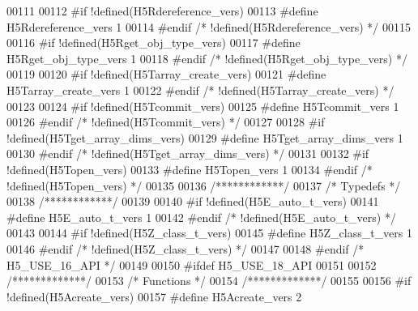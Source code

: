 \begin{DoxyCode}
00111 
00112 \textcolor{preprocessor}{#if !defined(H5Rdereference\_vers)}
00113 \textcolor{preprocessor}{  #define H5Rdereference\_vers 1}
00114 \textcolor{preprocessor}{#endif }\textcolor{comment}{/* !defined(H5Rdereference\_vers) */}\textcolor{preprocessor}{}
00115 
00116 \textcolor{preprocessor}{#if !defined(H5Rget\_obj\_type\_vers)}
00117 \textcolor{preprocessor}{  #define H5Rget\_obj\_type\_vers 1}
00118 \textcolor{preprocessor}{#endif }\textcolor{comment}{/* !defined(H5Rget\_obj\_type\_vers) */}\textcolor{preprocessor}{}
00119 
00120 \textcolor{preprocessor}{#if !defined(H5Tarray\_create\_vers)}
00121 \textcolor{preprocessor}{  #define H5Tarray\_create\_vers 1}
00122 \textcolor{preprocessor}{#endif }\textcolor{comment}{/* !defined(H5Tarray\_create\_vers) */}\textcolor{preprocessor}{}
00123 
00124 \textcolor{preprocessor}{#if !defined(H5Tcommit\_vers)}
00125 \textcolor{preprocessor}{  #define H5Tcommit\_vers 1}
00126 \textcolor{preprocessor}{#endif }\textcolor{comment}{/* !defined(H5Tcommit\_vers) */}\textcolor{preprocessor}{}
00127 
00128 \textcolor{preprocessor}{#if !defined(H5Tget\_array\_dims\_vers)}
00129 \textcolor{preprocessor}{  #define H5Tget\_array\_dims\_vers 1}
00130 \textcolor{preprocessor}{#endif }\textcolor{comment}{/* !defined(H5Tget\_array\_dims\_vers) */}\textcolor{preprocessor}{}
00131 
00132 \textcolor{preprocessor}{#if !defined(H5Topen\_vers)}
00133 \textcolor{preprocessor}{  #define H5Topen\_vers 1}
00134 \textcolor{preprocessor}{#endif }\textcolor{comment}{/* !defined(H5Topen\_vers) */}\textcolor{preprocessor}{}
00135 
00136 \textcolor{comment}{/************/}
00137 \textcolor{comment}{/* Typedefs */}
00138 \textcolor{comment}{/************/}
00139 
00140 \textcolor{preprocessor}{#if !defined(H5E\_auto\_t\_vers)}
00141 \textcolor{preprocessor}{  #define H5E\_auto\_t\_vers 1}
00142 \textcolor{preprocessor}{#endif }\textcolor{comment}{/* !defined(H5E\_auto\_t\_vers) */}\textcolor{preprocessor}{}
00143 
00144 \textcolor{preprocessor}{#if !defined(H5Z\_class\_t\_vers)}
00145 \textcolor{preprocessor}{  #define H5Z\_class\_t\_vers 1}
00146 \textcolor{preprocessor}{#endif }\textcolor{comment}{/* !defined(H5Z\_class\_t\_vers) */}\textcolor{preprocessor}{}
00147 
00148 \textcolor{preprocessor}{#endif }\textcolor{comment}{/* H5\_USE\_16\_API */}\textcolor{preprocessor}{}
00149 
00150 \textcolor{preprocessor}{#ifdef H5\_USE\_18\_API}
00151 
00152 \textcolor{comment}{/*************/}
00153 \textcolor{comment}{/* Functions */}
00154 \textcolor{comment}{/*************/}
00155 
00156 \textcolor{preprocessor}{#if !defined(H5Acreate\_vers)}
00157 \textcolor{preprocessor}{  #define H5Acreate\_vers 2}

\end{DoxyCode}
